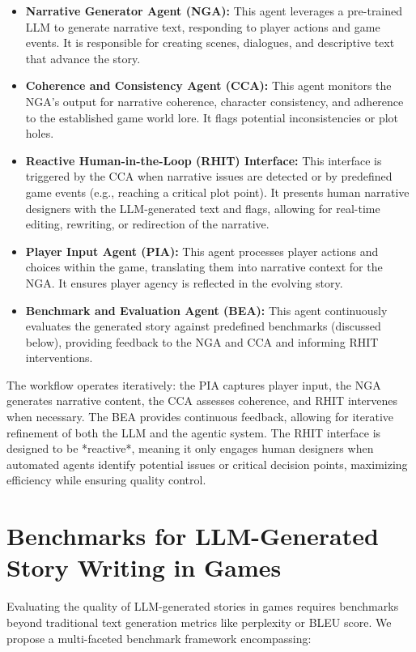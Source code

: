 \documentclass{article}
\begin{document}
\begin{itemize}
    \item \textbf{Narrative Generator Agent (NGA):}  This agent leverages a pre-trained LLM to generate narrative text, responding to player actions and game events.  It is responsible for creating scenes, dialogues, and descriptive text that advance the story.
    \item \textbf{Coherence and Consistency Agent (CCA):} This agent monitors the NGA's output for narrative coherence, character consistency, and adherence to the established game world lore.  It flags potential inconsistencies or plot holes.
    \item \textbf{Reactive Human-in-the-Loop (RHIT) Interface:} This interface is triggered by the CCA when narrative issues are detected or by predefined game events (e.g., reaching a critical plot point).  It presents human narrative designers with the LLM-generated text and flags, allowing for real-time editing, rewriting, or redirection of the narrative.
    \item \textbf{Player Input Agent (PIA):} This agent processes player actions and choices within the game, translating them into narrative context for the NGA.  It ensures player agency is reflected in the evolving story.
    \item \textbf{Benchmark and Evaluation Agent (BEA):}  This agent continuously evaluates the generated story against predefined benchmarks (discussed below), providing feedback to the NGA and CCA and informing RHIT interventions.
\end{itemize}

The workflow operates iteratively: the PIA captures player input, the NGA generates narrative content, the CCA assesses coherence, and RHIT intervenes when necessary. The BEA provides continuous feedback, allowing for iterative refinement of both the LLM and the agentic system.  The RHIT interface is designed to be *reactive*, meaning it only engages human designers when automated agents identify potential issues or critical decision points, maximizing efficiency while ensuring quality control.

\section{Benchmarks for LLM-Generated Story Writing in Games}

Evaluating the quality of LLM-generated stories in games requires benchmarks beyond traditional text generation metrics like perplexity or BLEU score. We propose a multi-faceted benchmark framework encompassing:
\end{document}
